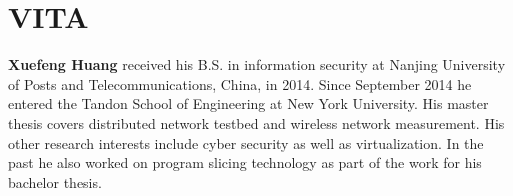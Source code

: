 \chapter*{VITA}
\textbf{Xuefeng Huang} received his B.S. in information security at Nanjing University of Posts and Telecommunications, China, in 2014. Since September 2014 he entered the Tandon School of Engineering at New York University. His master thesis covers distributed network testbed and wireless network measurement. His other research interests include cyber security as well as virtualization. In the past he also worked on program slicing technology as part of the work for his bachelor thesis.